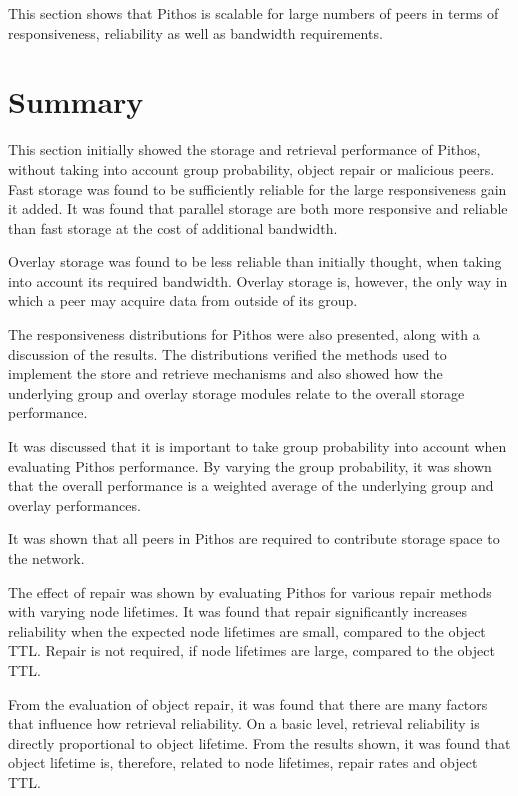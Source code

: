 This section shows that Pithos is scalable for large numbers of peers in terms of responsiveness, reliability as well as bandwidth requirements.

\section{Summary}

This section initially showed the storage and retrieval performance of Pithos, without taking into account group probability, object repair or malicious peers. Fast storage was found to be sufficiently reliable for the large responsiveness gain it added. It was found that parallel storage are both more responsive and reliable than fast storage at the cost of additional bandwidth.

Overlay storage was found to be less reliable than initially thought, when taking into account its required bandwidth. Overlay storage is, however, the only way in which a peer may acquire data from outside of its group.

The responsiveness distributions for Pithos were also presented, along with a discussion of the results. The distributions verified the methods used to implement the store and retrieve mechanisms and also showed how the underlying group and overlay storage modules relate to the overall storage performance.

It was discussed that it is important to take group probability into account when evaluating Pithos performance. By varying the group probability, it was shown that the overall performance is a weighted average of the underlying group and overlay performances.

It was shown that all peers in Pithos are required to contribute storage space to the network.

The effect of repair was shown by evaluating Pithos for various repair methods with varying node lifetimes. It was found that repair significantly increases reliability when the expected node lifetimes are small, compared to the object TTL. Repair is not required, if node lifetimes are large, compared to the object TTL.

From the evaluation of object repair, it was found that there are many factors that influence how retrieval reliability. On a basic level, retrieval reliability is directly proportional to object lifetime. From the results shown, it was found that object lifetime is, therefore, related to node lifetimes, repair rates and object TTL.

